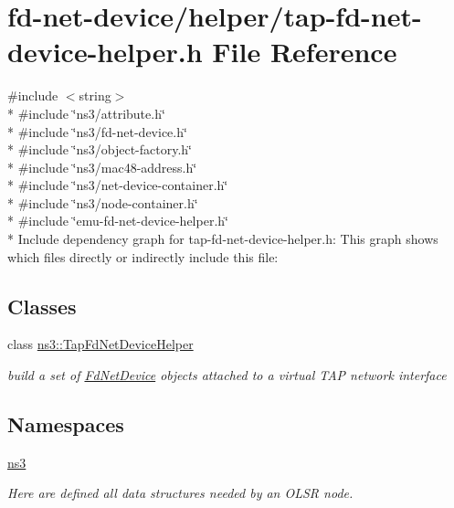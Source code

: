 \hypertarget{tap-fd-net-device-helper_8h}{}\section{fd-\/net-\/device/helper/tap-\/fd-\/net-\/device-\/helper.h File Reference}
\label{tap-fd-net-device-helper_8h}
{\ttfamily \#include $<$string$>$}\\*
{\ttfamily \#include \char`\"{}ns3/attribute.\+h\char`\"{}}\\*
{\ttfamily \#include \char`\"{}ns3/fd-\/net-\/device.\+h\char`\"{}}\\*
{\ttfamily \#include \char`\"{}ns3/object-\/factory.\+h\char`\"{}}\\*
{\ttfamily \#include \char`\"{}ns3/mac48-\/address.\+h\char`\"{}}\\*
{\ttfamily \#include \char`\"{}ns3/net-\/device-\/container.\+h\char`\"{}}\\*
{\ttfamily \#include \char`\"{}ns3/node-\/container.\+h\char`\"{}}\\*
{\ttfamily \#include \char`\"{}emu-\/fd-\/net-\/device-\/helper.\+h\char`\"{}}\\*
Include dependency graph for tap-\/fd-\/net-\/device-\/helper.h\+:
This graph shows which files directly or indirectly include this file\+:
\subsection*{Classes}
\begin{DoxyCompactItemize}
\item 
class \hyperlink{classns3_1_1TapFdNetDeviceHelper}{ns3\+::\+Tap\+Fd\+Net\+Device\+Helper}
\begin{DoxyCompactList}\small\item\em build a set of \hyperlink{classns3_1_1FdNetDevice}{Fd\+Net\+Device} objects attached to a virtual T\+AP network interface \end{DoxyCompactList}\end{DoxyCompactItemize}
\subsection*{Namespaces}
\begin{DoxyCompactItemize}
\item 
 \hyperlink{namespacens3}{ns3}
\begin{DoxyCompactList}\small\item\em Here are defined all data structures needed by an O\+L\+SR node. \end{DoxyCompactList}\end{DoxyCompactItemize}
